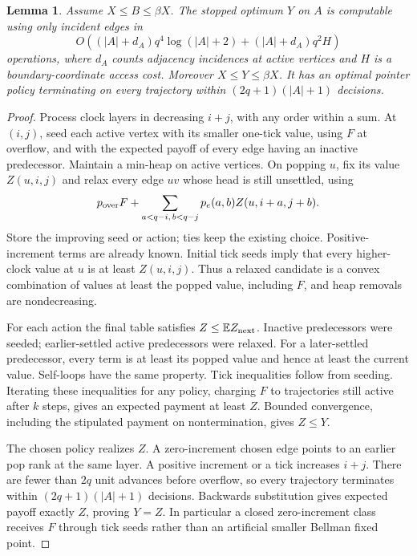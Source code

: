 \documentclass[acmsmall,11pt,screen,nonacm]{acmart}
\newcommand{\E}{\mathbb{E}}
\newtheorem{lemma}[theorem]{Lemma}
\begin{document}
\begin{lemma}\label{lem:oracle}
Assume $X\le B\le\beta X$. The stopped optimum $Y$ on $A$ is computable using only incident edges in
\[
 O((|A|+d_A)q^4\log(|A|+2)+(|A|+d_A)q^2H)
\]
operations, where $d_A$ counts adjacency incidences at active vertices and $H$ is a boundary-coordinate access cost. Moreover $X\le Y\le\beta X$. It has an optimal pointer policy terminating on every trajectory within $(2q+1)(|A|+1)$ decisions.
\end{lemma}
\begin{proof}
Process clock layers in decreasing $i+j$, with any order within a sum. At $(i,j)$, seed each active vertex with its smaller one-tick value, using $F$ at overflow, and with the expected payoff of every edge having an inactive predecessor. Maintain a min-heap on active vertices. On popping $u$, fix its value $Z(u,i,j)$ and relax every edge $uv$ whose head is still unsettled, using
\begin{equation}\label{eq:update}
 p_{\rm over}F+\sum_{a<q-i,\,b<q-j}p_e(a,b)Z(u,i+a,j+b).
\end{equation}
Store the improving seed or action; ties keep the existing choice. Positive-increment terms are already known. Initial tick seeds imply that every higher-clock value at $u$ is at least $Z(u,i,j)$. Thus a relaxed candidate is a convex combination of values at least the popped value, including $F$, and heap removals are nondecreasing.

For each action the final table satisfies $Z\le\E Z_{\rm next}$. Inactive predecessors were seeded; earlier-settled active predecessors were relaxed. For a later-settled predecessor, every term is at least its popped value and hence at least the current value. Self-loops have the same property. Tick inequalities follow from seeding. Iterating these inequalities for any policy, charging $F$ to trajectories still active after $k$ steps, gives an expected payment at least $Z$. Bounded convergence, including the stipulated payment on nontermination, gives $Z\le Y$.

The chosen policy realizes $Z$. A zero-increment chosen edge points to an earlier pop rank at the same layer. A positive increment or a tick increases $i+j$. There are fewer than $2q$ unit advances before overflow, so every trajectory terminates within $(2q+1)(|A|+1)$ decisions. Backwards substitution gives expected payoff exactly $Z$, proving $Y=Z$. In particular a closed zero-increment class receives $F$ through tick seeds rather than an artificial smaller Bellman fixed point.


\end{proof}
\end{document}

